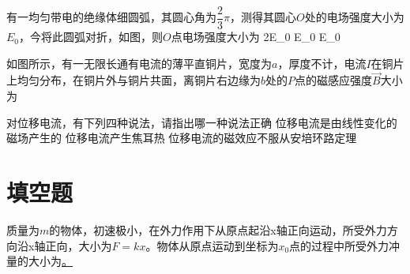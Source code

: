 有一均匀带电的绝缘体细圆弧，其圆心角为$\dfrac{2}{3}\pi$，测得其圆心$O$处的电场强度大小为$E_0$，今将此圆弧对折，如图，则$O$点电场强度大小为
{2E_0}
{E_0}
{E_0}        

如图所示，有一无限长通有电流的薄平直铜片，宽度为$a$，厚度不计，电流$I$在铜片上均匀分布，在铜片外与铜片共面，离铜片右边缘为$b$处的$P$点的磁感应强度$\vec{B}$大小为
{\ln{}}
{\ln{}}
{}%

对位移电流，有下列四种说法，请指出哪一种说法正确
{位移电流是由线性变化的磁场产生的}
{位移电流产生焦耳热}
{位移电流的磁效应不服从安培环路定理}

\section{填空题}

质量为$m$的物体，初速极小，在外力作用下从原点起沿x轴正向运动，所受外力方向沿x轴正向，大小为$F=kx$。物体从原点运动到坐标为$x_0$点的过程中所受外力冲量的大小为\ul。

